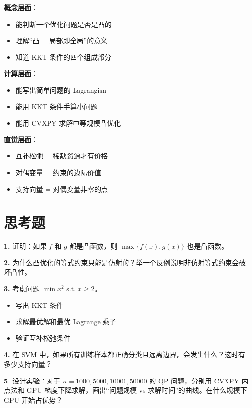 \documentclass[12pt, a4paper]{ctexart}
\begin{document}
\begin{keypoint}[带走的核心技能]

\textbf{概念层面}：
\begin{itemize}
    \item 能判断一个优化问题是否是凸的
    \item 理解``凸 = 局部即全局''的意义
    \item 知道 KKT 条件的四个组成部分
\end{itemize}

\textbf{计算层面}：
\begin{itemize}
    \item 能写出简单问题的 Lagrangian
    \item 能用 KKT 条件手算小问题
    \item 能用 CVXPY 求解中等规模凸优化
\end{itemize}

\textbf{直觉层面}：
\begin{itemize}
    \item 互补松弛 = 稀缺资源才有价格
    \item 对偶变量 = 约束的边际价值
    \item 支持向量 = 对偶变量非零的点
\end{itemize}

\end{keypoint}

\section{思考题}

\begin{blackboard}[思考题]

\textbf{1.} 证明：如果 $f$ 和 $g$ 都是凸函数，则 $\max\{f(x), g(x)\}$ 也是凸函数。

\textbf{2.} 为什么凸优化的等式约束只能是仿射的？举一个反例说明非仿射等式约束会破坏凸性。

\textbf{3.} 考虑问题 $\min x^2$ s.t. $x \geq 2$。
\begin{itemize}
    \item[(a)] 写出 KKT 条件
    \item[(b)] 求解最优解和最优 Lagrange 乘子
    \item[(c)] 验证互补松弛条件
\end{itemize}

\textbf{4.} 在 SVM 中，如果所有训练样本都正确分类且远离边界，会发生什么？这时有多少支持向量？

\textbf{5.} 设计实验：对于 $n = 1000, 5000, 10000, 50000$ 的 QP 问题，分别用 CVXPY 内点法和 GPU 梯度下降求解，画出``问题规模 vs 求解时间''的曲线。在什么规模下 GPU 开始占优势？

\end{blackboard}
\end{document}

